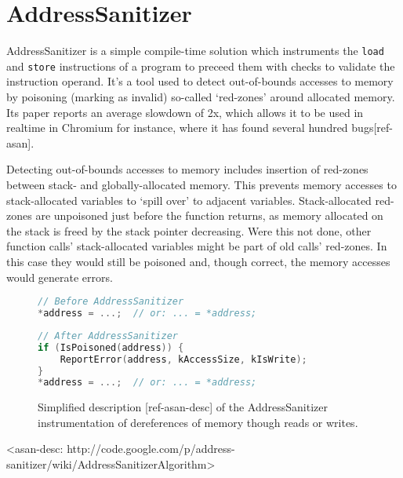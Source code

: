 \section {AddressSanitizer}

AddressSanitizer is a simple compile-time solution which instruments the
\texttt{load} and \texttt{store} instructions of a program to preceed them with
checks to validate the instruction operand.
It's a tool used to detect out-of-bounds accesses to memory by poisoning
(marking as invalid) so-called `red-zones' around allocated memory.
Its paper reports an average slowdown of 2x, which allows it to be used in
realtime in Chromium for instance, where it has found several hundred
bugs[ref-asan].

Detecting out-of-bounds accesses to memory includes insertion of red-zones
between stack- and globally-allocated memory.
This prevents memory accesses to stack-allocated variables to `spill over' to
adjacent variables.
Stack-allocated red-zones are unpoisoned just before the function returns, as
memory allocated on the stack is freed by the stack pointer decreasing.
Were this not done, other function calls' stack-allocated variables might be
part of old calls' red-zones.
In this case they would still be poisoned and, though correct, the memory
accesses would generate errors.

\begin{figure}[ht]
\begin{lstlisting}[language=C]
// Before AddressSanitizer
*address = ...;  // or: ... = *address;
\end{lstlisting}

\begin{lstlisting}[language=C]
// After AddressSanitizer
if (IsPoisoned(address)) {
    ReportError(address, kAccessSize, kIsWrite);
}
*address = ...;  // or: ... = *address;
\end{lstlisting}
\caption{Simplified description [ref-asan-desc] of the AddressSanitizer
instrumentation of dereferences of memory though reads or writes.}
\end{figure}

<asan-desc: http://code.google.com/p/address-sanitizer/wiki/AddressSanitizerAlgorithm>

